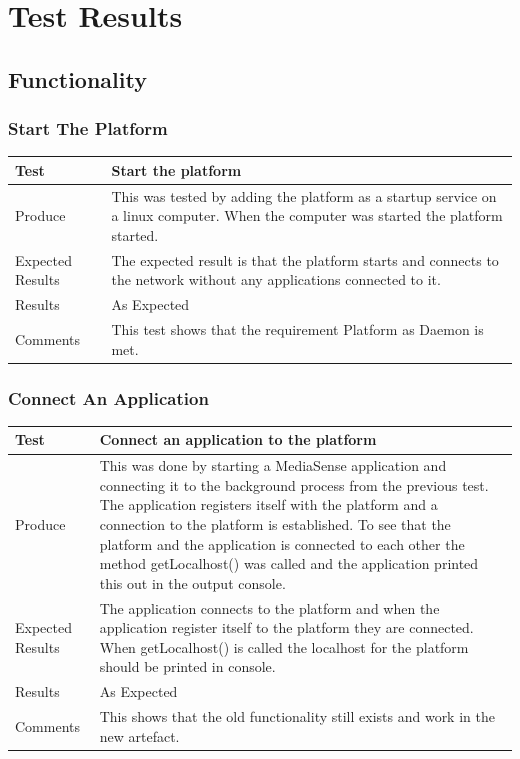 \section{Test Results}
\subsection{Functionality}

\subsubsection{Start The Platform}
\begin{center}
    \begin{tabular}{ | l | p{12cm} |}
    \hline
    Test 	 				& 		 Start the platform\\ \hline
	Produce  				& 		 This was tested by adding the platform as a startup service on a linux computer. When the computer was started the platform started.\\ \hline
	Expected Results  		& 		 The expected result is that the platform starts and connects to the network without any applications connected to it. \\ \hline
	Results 				& 		 As Expected\\ \hline
	Comments				& 		 This test shows that the requirement Platform as Daemon is met.\\ \hline
    \end{tabular}
\end{center}

\subsubsection{Connect An Application}
\begin{center}
    \begin{tabular}{ | l | p{12cm} |}
    \hline
    Test 	 				& 		 Connect an application to the platform \\ \hline
	Produce  				& 		 This was done by starting a MediaSense application and connecting it to the background process from the previous test. The application registers itself with the platform and a connection to the platform is established. To see that the platform and the application is connected to each other the method getLocalhost() was called and the application printed this out in the output console. \\ \hline
	Expected Results  		& 		 The application connects to the platform and when the application register itself to the platform they are connected. When getLocalhost() is called the localhost for the platform should be printed in console. \\ \hline
	Results 				& 		 As Expected\\ \hline
	Comments				& 		 This shows that the old functionality still exists and work in the new artefact.\\ \hline
    \end{tabular}
\end{center}

